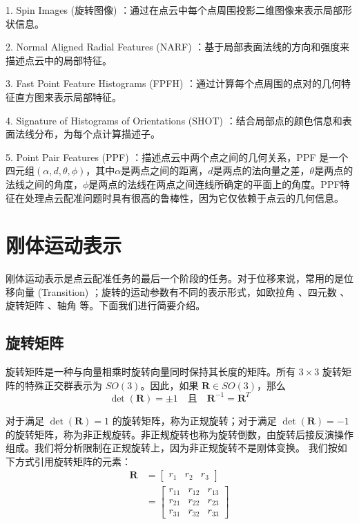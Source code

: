 1. Spin Images (旋转图像)  \cite{johnson1997spin} ：通过在点云中每个点周围投影二维图像来表示局部形状信息。

2. Normal Aligned Radial Features (NARF)  \cite{steder2010narf} ：基于局部表面法线的方向和强度来描述点云中的局部特征。

3. Fast Point Feature Histograms (FPFH)  \cite{rusu2009fast} ：通过计算每个点周围的点对的几何特征直方图来表示局部特征。

4. Signature of Histograms of Orientations (SHOT)  \cite{salti2014shot} ：结合局部点的颜色信息和表面法线分布，为每个点计算描述子。

5. Point Pair Features (PPF)  \cite{deng2018ppfnet} ：描述点云中两个点之间的几何关系，PPF 是一个四元组$(\alpha, d, \theta, \phi)$，其中$\alpha$是两点之间的距离，$d$是两点的法向量之差，$\theta$是两点的法线之间的角度，$\phi$是两点的法线在两点之间连线所确定的平面上的角度。PPF特征在处理点云配准问题时具有很高的鲁棒性，因为它仅依赖于点云的几何信息。

\section{刚体运动表示}
刚体运动表示是点云配准任务的最后一个阶段的任务。对于位移来说，常用的是位移向量 (Transition) ；旋转的运动参数有不同的表示形式，如欧拉角\cite{pio1966euler} 、四元数\cite{shoemake1985animating} 、旋转矩阵\cite{horn1954doubly} 、轴角\cite{diebel2006representing} 等。下面我们进行简要介绍。

\subsection{旋转矩阵}
旋转矩阵是一种与向量相乘时旋转向量同时保持其长度的矩阵。所有 $3 \times 3$ 旋转矩阵的特殊正交群表示为 $SO(3)$。因此，如果 $\boldsymbol{R} \in SO(3)$，那么
\begin{equation}
\det (\boldsymbol{R}) = \pm1 \quad \text{且} \quad \boldsymbol{R}^{-1} = \boldsymbol{R}^T
\end{equation}

对于满足 $\det (\boldsymbol{R}) = 1$ 的旋转矩阵，称为正规旋转；对于满足 $\det (\boldsymbol{R}) = -1$ 的旋转矩阵，称为非正规旋转。非正规旋转也称为旋转倒数，由旋转后接反演操作组成。我们将分析限制在正规旋转上，因为非正规旋转不是刚体变换。
我们按如下方式引用旋转矩阵的元素：
\begin{align}
    \boldsymbol{R} &=
    \begin{bmatrix}
    r_1 & r_2 & r_3
    \end{bmatrix} \\
    &=
    \begin{bmatrix}
    r_{11} & r_{12} & r_{13} \\
    r_{21} & r_{22} & r_{23} \\
    r_{31} & r_{32} & r_{33}
    \end{bmatrix}
\end{align}

